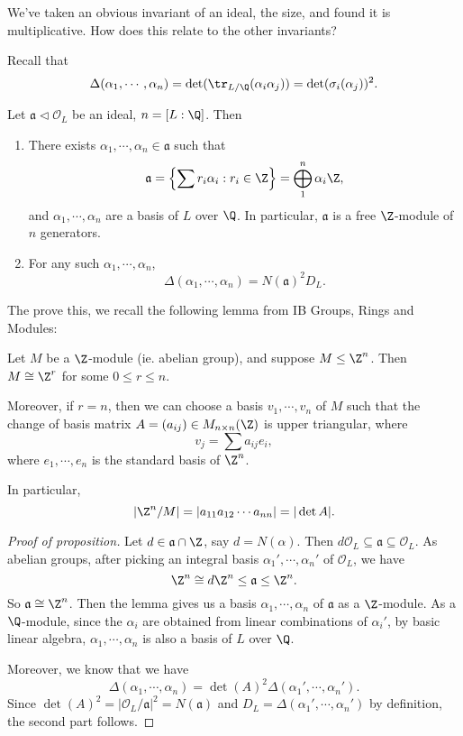 \documentclass[a4paper]{article}
\begin{document}
We've taken an obvious invariant of an ideal, the size, and found it is multiplicative. How does this relate to the other invariants?

Recall that
\[
  \Delta(\alpha_1, \cdots, \alpha_n) = \det(\tr_{L/\Q}(\alpha_i\alpha_j)) = \det(\sigma_i(\alpha_j))^2.
\]
\begin{prop}
  Let $\mathfrak{a} \lhd \mathcal{O}_L$ be an ideal, $n = [L:\Q]$. Then
  \begin{enumerate}
    \item There exists $\alpha_1, \cdots, \alpha_n \in \mathfrak{a}$ such that
      \[
        \mathfrak{a} = \left\{ \sum r_i \alpha_i : r_i \in \Z\right\} = \bigoplus_{1}^n \alpha_i\Z,
      \]
      and $\alpha_1, \cdots, \alpha_n$ are a basis of $L$ over $\Q$. In particular, $\mathfrak{a}$ is a free $\Z$-module of $n$ generators.
    \item For any such $\alpha_1, \cdots, \alpha_n$,
      \[
        \Delta (\alpha_1, \cdots, \alpha_n) = N(\mathfrak{a})^2 D_L.
      \]
  \end{enumerate}
\end{prop}

The prove this, we recall the following lemma from IB Groups, Rings and Modules:
\begin{lemma}
  Let $M$ be a $\Z$-module (ie. abelian group), and suppose $M \leq \Z^n$. Then $M \cong \Z^r$ for some $0 \leq r \leq n$.

  Moreover, if $r = n$, then we can choose a basis $v_1, \cdots, v_n$ of $M$ such that the change of basis matrix $A = (a_{ij}) \in M_{n \times n}(\Z)$ is upper triangular, where
  \[
    v_j = \sum a_{ij} e_i,
  \]
  where $e_1, \cdots, e_n$ is the standard basis of $\Z^n$.

  In particular,
  \[
    |\Z^n/M| = |a_{11} a_{12} \cdots a_{nn}| = |\det A|.
  \]
\end{lemma}

\begin{proof}[Proof of proposition]
  Let $d \in \mathfrak{a} \cap \Z$, say $d = N(\alpha)$. Then $d \mathcal{O}_L \subseteq \mathfrak{a} \subseteq \mathcal{O}_L$. As abelian groups, after picking an integral basis $\alpha_1', \cdots, \alpha_n'$ of $\mathcal{O}_L$, we have
  \[
    \Z^n \cong d \Z^n \leq \mathfrak{a} \leq \Z^n.
  \]
  So $\mathfrak{a} \cong \Z^n$. Then the lemma gives us a basis $\alpha_1, \cdots, \alpha_n$ of $\mathfrak{a}$ as a $\Z$-module. As a $\Q$-module, since the $\alpha_i$ are obtained from linear combinations of $\alpha_i'$, by basic linear algebra, $\alpha_1, \cdots, \alpha_n$ is also a basis of $L$ over $\Q$.

  Moreover, we know that we have
  \[
    \Delta(\alpha_1, \cdots, \alpha_n) = \det(A)^2 \Delta(\alpha_1', \cdots, \alpha_n').
  \]
  Since $\det(A)^2 = |\mathcal{O}_L/\mathfrak{a}|^2 = N(\mathfrak{a})$ and $D_L = \Delta(\alpha_1', \cdots, \alpha_n')$ by definition, the second part follows.
\end{proof}
\end{document}

